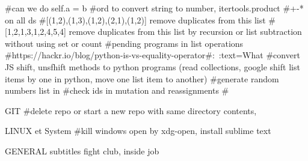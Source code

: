 #can we do self.a = b
#ord to convert string to number, itertools.product
#+-* on all ds
#[(1,2),(1,3),(1,2),(2,1),(1,2)] remove duplicates from this list
#[1,2,1,3,1,2,4,5,4] remove duplicates from this list by recursion or list subtraction without using set or count
#pending programs in list operations
#https://hackr.io/blog/python-is-vs-equality-operator#:~:text=What%
#convert JS shift, unsfhift methods to python programs (read collections, google shift list items by one in python, move one list item to another)
#generate random numbers list in
#check ids in mutation and reassignments
#


GIT
#delete repo or start a new repo with same directory contents,  



LINUX et System
#kill windows open by xdg-open, install sublime text

GENERAL
subtitles fight club, inside job
